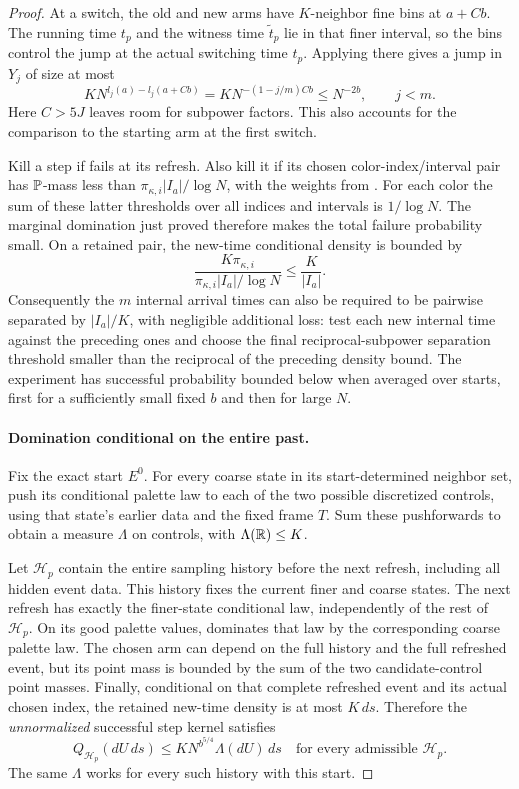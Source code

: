 \begin{proof}
At a switch, the old and new arms have \(K\)-neighbor fine bins
at \(a+Cb\).  The running time \(t_p\) and the witness time
\(\widetilde t_p\) lie in that finer interval, so the bins control
the jump at the actual switching time \(t_p\).  Applying
 there gives a jump in \(Y_j\) of
size at most
\[
 K N^{l_j(a)-l_j(a+Cb)}
 =K N^{-(1-j/m)Cb}
 \le N^{-2b},\qquad j<m.
\]
Here \(C>5J\) leaves room for subpower factors.  This also accounts
for the comparison to the starting arm at the first switch.

Kill a step if  fails at its refresh.
Also kill it if its chosen color-index/interval pair has
\(\mathbb P\)-mass less than
\(\pi_{\kappa,i}|I_a|/\log N\), with the weights from
.  For each color the sum of these latter
thresholds over all indices and intervals is \(1/\log N\).
The marginal domination just proved therefore makes the total
failure probability small.  On a retained pair, the new-time
conditional density is bounded by
\[
 \frac{K\pi_{\kappa,i}}
 {\pi_{\kappa,i}|I_a|/\log N}
 \le \frac K{|I_a|}.
\]
Consequently the \(m\) internal arrival times can also be required
to be pairwise separated by \(|I_a|/K\), with negligible additional
loss: test each new internal time against the preceding ones and
choose the final reciprocal-subpower separation threshold smaller
than the reciprocal of the preceding density bound.  The experiment
has successful probability bounded below when averaged over starts,
first for a sufficiently small fixed \(b\) and then for large \(N\).

\paragraph{Domination conditional on the entire past.}
Fix the exact start \(E^0\).  For every coarse state in its
start-determined neighbor set, push its conditional palette law
to each of the two possible discretized controls, using that
state's earlier data and the fixed frame \(T\).  Sum these
pushforwards to obtain a measure \(\Lambda\) on controls, with
\(\Lambda(\mathbb R)\le K\).

Let \(\mathcal H_p\) contain the entire sampling history before
the next refresh, including all hidden event data.  This history
fixes the current finer and coarse states.  The next refresh has
exactly the finer-state conditional law, independently of the
rest of \(\mathcal H_p\).  On its good palette values,
 dominates that law by the corresponding
coarse palette law.  The chosen arm can depend on the full history
and the full refreshed event, but its point mass is bounded by the
sum of the two candidate-control point masses.  Finally, conditional
on that complete refreshed event and its actual chosen index, the
retained new-time density is at most \(K\,ds\).  Therefore the
\emph{unnormalized} successful step kernel satisfies
\begin{equation}
 Q_{\mathcal H_p}(dU\,ds)
 \le K N^{b^{5/4}}\Lambda(dU)\,ds
 \quad\text{for every admissible }\mathcal H_p.
 \label{a02:full-past-kernel}
\end{equation}
The same \(\Lambda\) works for every such history with this start.


\end{proof}
